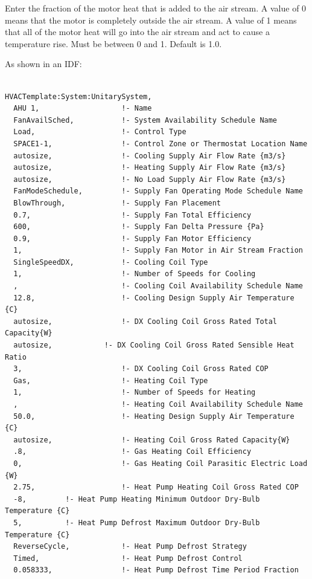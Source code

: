 Enter the fraction of the motor heat that is added to the air stream. A value of 0 means that the motor is completely outside the air stream. A value of 1 means that all of the motor heat will go into the air stream and act to cause a temperature rise. Must be between 0 and 1. Default is 1.0.

As shown in an IDF:

\begin{lstlisting}

HVACTemplate:System:UnitarySystem,
  AHU 1,                   !- Name
  FanAvailSched,           !- System Availability Schedule Name
  Load,                    !- Control Type
  SPACE1-1,                !- Control Zone or Thermostat Location Name
  autosize,                !- Cooling Supply Air Flow Rate {m3/s}
  autosize,                !- Heating Supply Air Flow Rate {m3/s}
  autosize,                !- No Load Supply Air Flow Rate {m3/s}
  FanModeSchedule,         !- Supply Fan Operating Mode Schedule Name
  BlowThrough,             !- Supply Fan Placement
  0.7,                     !- Supply Fan Total Efficiency
  600,                     !- Supply Fan Delta Pressure {Pa}
  0.9,                     !- Supply Fan Motor Efficiency
  1,                       !- Supply Fan Motor in Air Stream Fraction
  SingleSpeedDX,           !- Cooling Coil Type
  1,                       !- Number of Speeds for Cooling
  ,                        !- Cooling Coil Availability Schedule Name
  12.8,                    !- Cooling Design Supply Air Temperature {C}
  autosize,                !- DX Cooling Coil Gross Rated Total Capacity{W}
  autosize,            !- DX Cooling Coil Gross Rated Sensible Heat Ratio
  3,                       !- DX Cooling Coil Gross Rated COP
  Gas,                     !- Heating Coil Type
  1,                       !- Number of Speeds for Heating
  ,                        !- Heating Coil Availability Schedule Name
  50.0,                    !- Heating Design Supply Air Temperature {C}
  autosize,                !- Heating Coil Gross Rated Capacity{W}
  .8,                      !- Gas Heating Coil Efficiency
  0,                       !- Gas Heating Coil Parasitic Electric Load {W}
  2.75,                    !- Heat Pump Heating Coil Gross Rated COP
  -8,         !- Heat Pump Heating Minimum Outdoor Dry-Bulb Temperature {C}
  5,          !- Heat Pump Defrost Maximum Outdoor Dry-Bulb Temperature {C}
  ReverseCycle,            !- Heat Pump Defrost Strategy
  Timed,                   !- Heat Pump Defrost Control
  0.058333,                !- Heat Pump Defrost Time Period Fraction

\end{lstlisting}
